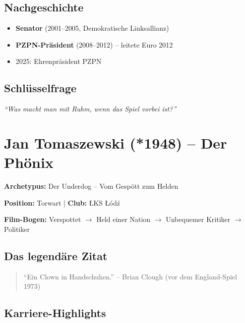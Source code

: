 \documentclass[11pt,a4paper]{book}
\newenvironment{filminfo}{%
  \begin{mdframed}[
    linecolor=darkgray,
    linewidth=1pt,
    backgroundcolor=gray!5,
    innertopmargin=10pt,
    innerbottommargin=10pt
  ]
}{%
  \end{mdframed}
}
\newenvironment{kontextbox}{%
  \begin{mdframed}[
    linecolor=polishred,
    linewidth=1pt,
    backgroundcolor=white,
    leftmargin=20pt,
    rightmargin=20pt
  ]
}{%
  \end{mdframed}
}
\begin{document}
\subsection{Nachgeschichte}

\begin{itemize}
    \item \textbf{Senator} (2001--2005, Demokratische Linksallianz)
    \item \textbf{PZPN-Präsident} (2008--2012) -- leitete Euro 2012
    \item 2025: Ehrenpräsident PZPN
\end{itemize}

\subsection{Schlüsselfrage}

\begin{kontextbox}
\textit{``Was macht man mit Ruhm, wenn das Spiel vorbei ist?''}
\end{kontextbox}


\section{Jan Tomaszewski (*1948) -- Der Phönix}

\begin{filminfo}
\textbf{Archetypus:} Der Underdog -- Vom Gespött zum Helden

\textbf{Position:} Torwart | \textbf{Club:} ŁKS Łódź

\textbf{Film-Bogen:} Verspottet $\rightarrow$ Held einer Nation $\rightarrow$ Unbequemer Kritiker $\rightarrow$ Politiker
\end{filminfo}

\subsection{Das legendäre Zitat}

\begin{quote}
``Ein Clown in Handschuhen.'' -- Brian Clough (vor dem England-Spiel 1973)
\end{quote}

\subsection{Karriere-Highlights}
\end{document}
